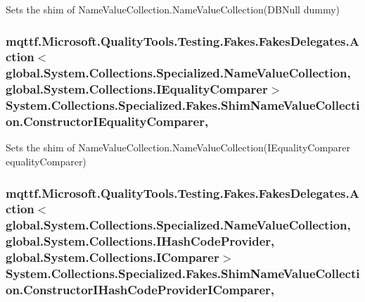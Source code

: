 Sets the shim of Name\-Value\-Collection.\-Name\-Value\-Collection(\-D\-B\-Null dummy)

\hypertarget{class_system_1_1_collections_1_1_specialized_1_1_fakes_1_1_shim_name_value_collection_a30057374aed2892ad722e91943e95ce9}{
\subsubsection[{Constructor\-I\-Equality\-Comparer}]{\setlength{\rightskip}{0pt plus 5cm}mqttf.\-Microsoft.\-Quality\-Tools.\-Testing.\-Fakes.\-Fakes\-Delegates.\-Action$<$global.\-System.\-Collections.\-Specialized.\-Name\-Value\-Collection, global.\-System.\-Collections.\-I\-Equality\-Comparer$>$ System.\-Collections.\-Specialized.\-Fakes.\-Shim\-Name\-Value\-Collection.\-Constructor\-I\-Equality\-Comparer\hspace{0.3cm}{\ttfamily [static]}, {\ttfamily [set]}}}\label{class_system_1_1_collections_1_1_specialized_1_1_fakes_1_1_shim_name_value_collection_a30057374aed2892ad722e91943e95ce9}


Sets the shim of Name\-Value\-Collection.\-Name\-Value\-Collection(\-I\-Equality\-Comparer equality\-Comparer)

\hypertarget{class_system_1_1_collections_1_1_specialized_1_1_fakes_1_1_shim_name_value_collection_ab1e06d4353d4634c29864c17e686d1fb}{
\subsubsection[{Constructor\-I\-Hash\-Code\-Provider\-I\-Comparer}]{\setlength{\rightskip}{0pt plus 5cm}mqttf.\-Microsoft.\-Quality\-Tools.\-Testing.\-Fakes.\-Fakes\-Delegates.\-Action$<$global.\-System.\-Collections.\-Specialized.\-Name\-Value\-Collection, global.\-System.\-Collections.\-I\-Hash\-Code\-Provider, global.\-System.\-Collections.\-I\-Comparer$>$ System.\-Collections.\-Specialized.\-Fakes.\-Shim\-Name\-Value\-Collection.\-Constructor\-I\-Hash\-Code\-Provider\-I\-Comparer\hspace{0.3cm}{\ttfamily [static]}, {\ttfamily [set]}}}\label{class_system_1_1_collections_1_1_specialized_1_1_fakes_1_1_shim_name_value_collection_ab1e06d4353d4634c29864c17e686d1fb}


